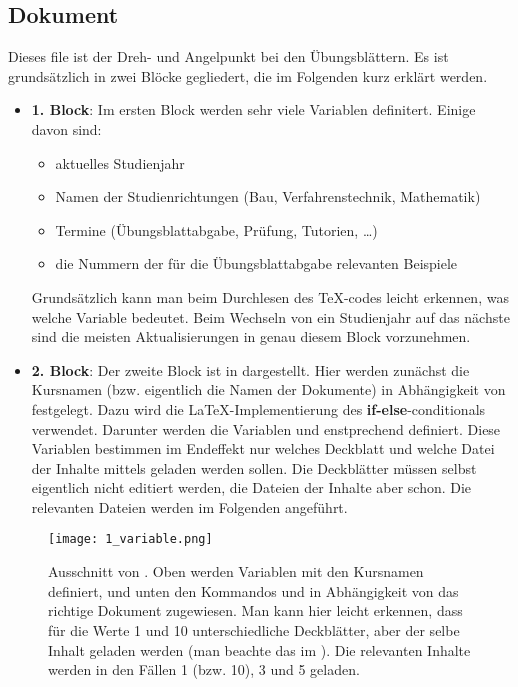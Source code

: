 \subsection{Dokument }

Dieses file ist der Dreh- und Angelpunkt bei den Übungsblättern. Es ist
grundsätzlich in zwei Blöcke gegliedert, die im Folgenden kurz erklärt werden.

\begin{itemize}
 \item {\bf 1. Block}: Im ersten Block werden sehr viele Variablen definitert. 
   Einige davon sind:
   \begin {itemize}
    \item aktuelles Studienjahr
    \item Namen der Studienrichtungen (Bau, Verfahrenstechnik, Mathematik)
    \item Termine (Übungsblattabgabe, Prüfung, Tutorien, \dots)
    \item die Nummern der für die Übungsblattabgabe relevanten Beispiele
   \end{itemize}
   Grundsätzlich kann man beim Durchlesen des \TeX-codes leicht erkennen, was
   welche Variable bedeutet. Beim Wechseln von ein Studienjahr auf das nächste
   sind die meisten Aktualisierungen in genau diesem Block vorzunehmen.
 \item {\bf 2. Block}: Der zweite Block ist in  
   dargestellt. Hier werden zunächst die Kursnamen (bzw. eigentlich die Namen
   der Dokumente) in Abhängigkeit von 
   festgelegt. Dazu wird die \LaTeX-Implementierung des 
   {\bf if-else}-conditionals  verwendet.
   Darunter werden die Variablen  und
    enstprechend definiert. Diese Variablen
   bestimmen im Endeffekt nur welches Deckblatt und welche Datei der Inhalte
   mittels  geladen werden sollen. Die 
   Deckblätter müssen selbst eigentlich nicht editiert werden, die 
   Dateien der Inhalte aber schon. Die relevanten Dateien werden im Folgenden 
   angeführt.
\end{itemize}

\begin{figure}[htbp]
  \texttt{[image: 1\_variable.png]}
  \caption{Ausschnitt von . Oben werden Variablen mit
    den Kursnamen definiert, und unten den Kommandos
     und 
    in Abhängigkeit von  das richtige Dokument
    zugewiesen. Man kann hier leicht erkennen, dass für die Werte 1 und 10
    unterschiedliche Deckblätter, aber der selbe Inhalt geladen werden
    (man beachte das  im ). Die
    relevanten Inhalte werden in den Fällen 1 (bzw. 10), 3 und 5 geladen.}
  \label{fig:variable}
\end{figure}


